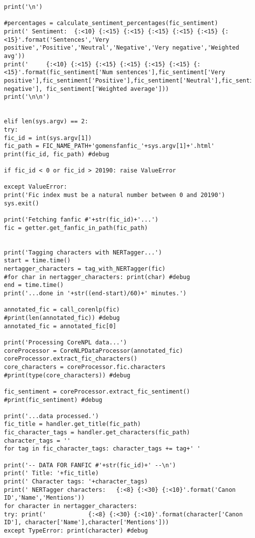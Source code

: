 \documentclass{pre-tfg}
\begin{document}
\begin{lstlisting}[style=consola]
print('\n')

#percentages = calculate_sentiment_percentages(fic_sentiment)	
print(' Sentiment:	{:<10} {:<15} {:<15} {:<15} {:<15} {:<15} {:<15}'.format('Sentences','Very positive','Positive','Neutral','Negative','Very negative','Weighted avg'))
print('		{:<10} {:<15} {:<15} {:<15} {:<15} {:<15} {:<15}'.format(fic_sentiment['Num sentences'],fic_sentiment['Very positive'],fic_sentiment['Positive'],fic_sentiment['Neutral'],fic_sentiment['Negative'],fic_sentiment['Very negative'], fic_sentiment['Weighted average']))
print('\n\n')


elif len(sys.argv) == 2:
try: 
fic_id = int(sys.argv[1])
fic_path = FIC_NAME_PATH+'gomensfanfic_'+sys.argv[1]+'.html'
print(fic_id, fic_path) #debug

if fic_id < 0 or fic_id > 20190: raise ValueError

except ValueError:
print('Fic index must be a natural number between 0 and 20190')
sys.exit()

print('Fetching fanfic #'+str(fic_id)+'...')
fic = getter.get_fanfic_in_path(fic_path)


print('Tagging characters with NERTagger...')
start = time.time()
nertagger_characters = tag_with_NERTagger(fic)
#for char in nertagger_characters: print(char) #debug
end = time.time()  
print('...done in '+str((end-start)/60)+' minutes.')

annotated_fic = call_corenlp(fic)
#print(len(annotated_fic)) #debug
annotated_fic = annotated_fic[0]

print('Processing CoreNPL data...')
coreProcessor = CoreNLPDataProcessor(annotated_fic)
coreProcessor.extract_fic_characters()
core_characters = coreProcessor.fic.characters
#print(type(core_characters)) #debug

fic_sentiment = coreProcessor.extract_fic_sentiment()
#print(fic_sentiment) #debug

print('...data processed.')
fic_title = handler.get_title(fic_path)
fic_character_tags = handler.get_characters(fic_path)
character_tags = ''
for tag in fic_character_tags: character_tags += tag+' '

print('-- DATA FOR FANFIC #'+str(fic_id)+' --\n')
print(' Title: '+fic_title)
print(' Character tags: '+character_tags)
print(' NERTagger characters:	{:<8} {:<30} {:<10}'.format('Canon ID','Name','Mentions'))
for character in nertagger_characters:
try: print('			{:<8} {:<30} {:<10}'.format(character['Canon ID'], character['Name'],character['Mentions']))
except TypeError: print(character) #debug


\end{lstlisting}
\end{document}
